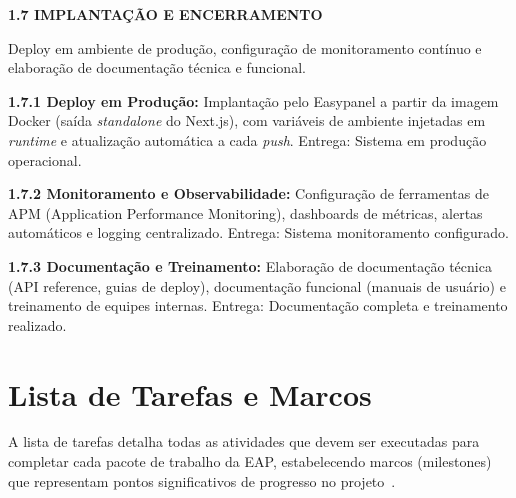\textbf{1.7 IMPLANTAÇÃO E ENCERRAMENTO}

Deploy em ambiente de produção, configuração de monitoramento contínuo e elaboração de documentação técnica e funcional.

\textbf{1.7.1 Deploy em Produção:} Implantação pelo Easypanel a partir da imagem Docker (saída \textit{standalone} do Next.js), com variáveis de ambiente injetadas em \textit{runtime} e atualização automática a cada \textit{push}. Entrega: Sistema em produção operacional.

\textbf{1.7.2 Monitoramento e Observabilidade:} Configuração de ferramentas de APM (Application Performance Monitoring), dashboards de métricas, alertas automáticos e logging centralizado. Entrega: Sistema monitoramento configurado.

\textbf{1.7.3 Documentação e Treinamento:} Elaboração de documentação técnica (API reference, guias de deploy), documentação funcional (manuais de usuário) e treinamento de equipes internas. Entrega: Documentação completa e treinamento realizado.

\section{Lista de Tarefas e Marcos}

A lista de tarefas detalha todas as atividades que devem ser executadas para completar cada pacote de trabalho da EAP, estabelecendo marcos (milestones) que representam pontos significativos de progresso no projeto~\cite{Kerzner:2022}.

